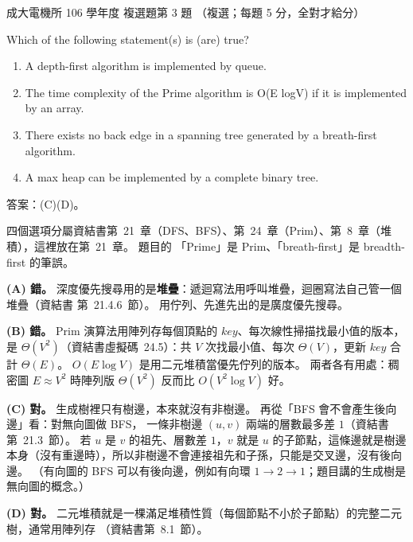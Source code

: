 \begin{pastexam}[label={px:ncku-106-ee-ds-03}]{成大電機所 106 學年度 複選題第 3 題}
（複選；每題 5 分，全對才給分）

Which of the following statement(s) is (are) true?
\begin{enumerate}[label=(\Alph*)]
\item A depth-first algorithm is implemented by queue.
\item The time complexity of the Prime algorithm is O(E logV) if it is implemented by an array.
\item There exists no back edge in a spanning tree generated by a breath-first algorithm.
\item A max heap can be implemented by a complete binary tree.
\end{enumerate}
\end{pastexam}

\begin{pastsoln}
答案：(C)(D)。

四個選項分屬資結書第~21~章（DFS、BFS）、第~24~章（Prim）、第~8~章（堆積），這裡放在第~21~章。 題目的
「Prime」是 Prim、「breath-first」是 breadth-first 的筆誤。

\textbf{(A) 錯。} 深度優先搜尋用的是\textbf{堆疊}：遞迴寫法用呼叫堆疊，迴圈寫法自己管一個堆疊（資結書
第~21.4.6~節）。 用佇列、先進先出的是廣度優先搜尋。

\textbf{(B) 錯。} Prim 演算法用陣列存每個頂點的 $\mathit{key}$、每次線性掃描找最小值的版本，是
$\Theta(V^2)$（資結書虛擬碼~24.5）：共 $V$ 次找最小值、每次 $\Theta(V)$，更新 $\mathit{key}$ 合計
$\Theta(E)$。 $O(E \log V)$ 是用二元堆積當優先佇列的版本。 兩者各有用處：稠密圖 $E \approx V^2$ 時陣列版
$\Theta(V^2)$ 反而比 $O(V^2 \log V)$ 好。

\textbf{(C) 對。} 生成樹裡只有樹邊，本來就沒有非樹邊。 再從「BFS 會不會產生後向邊」看：對無向圖做 BFS，
一條非樹邊 $(u, v)$ 兩端的層數最多差 $1$（資結書第~21.3~節）。 若 $u$ 是 $v$ 的祖先、層數差 $1$，$v$ 就是 $u$
的子節點，這條邊就是樹邊本身（沒有重邊時），所以非樹邊不會連接祖先和子孫，只能是交叉邊，沒有後向邊。
（有向圖的 BFS 可以有後向邊，例如有向環 $1 \to 2 \to 1$；題目講的生成樹是無向圖的概念。）

\textbf{(D) 對。} 二元堆積就是一棵滿足堆積性質（每個節點不小於子節點）的完整二元樹，通常用陣列存
（資結書第~8.1~節）。
\end{pastsoln}
